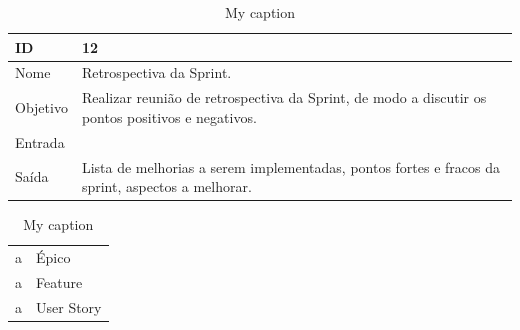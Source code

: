 \begin{table}[\htp]
\centering
\caption{My caption}
\label{my-label}
\begin{tabular}{|l|l|}
\hline
ID       & 12                                           \\ \hline
Nome     & Retrospectiva da Sprint. \\ \hline
Objetivo & Realizar reunião de retrospectiva da Sprint, de modo a discutir os pontos positivos e negativos.
 \\ \hline
Entrada  & \\ \hline
Saída    &  Lista de melhorias a serem implementadas, pontos fortes e fracos da sprint, aspectos a melhorar.\\ \hline
\end{tabular}
\end{table}



















\begin{table}[]
\centering
\caption{My caption}
\label{my-label}
\begin{tabular}{ll}
a & Épico \\
a & Feature \\
a & User Story
\end{tabular}
\end{table}
